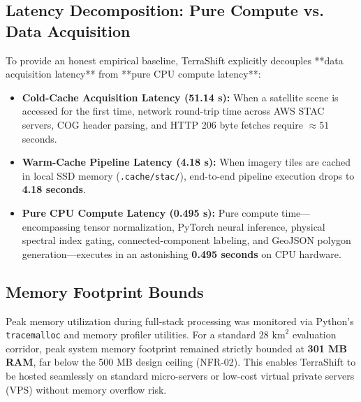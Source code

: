 \subsection{Latency Decomposition: Pure Compute vs. Data Acquisition}
To provide an honest empirical baseline, TerraShift explicitly decouples **data acquisition latency** from **pure CPU compute latency**:
\begin{itemize}
    \item \textbf{Cold-Cache Acquisition Latency (51.14 s):} When a satellite scene is accessed for the first time, network round-trip time across AWS STAC servers, COG header parsing, and HTTP 206 byte fetches require $\approx 51$ seconds.
    \item \textbf{Warm-Cache Pipeline Latency (4.18 s):} When imagery tiles are cached in local SSD memory (\texttt{.cache/stac/}), end-to-end pipeline execution drops to \textbf{4.18 seconds}.
    \item \textbf{Pure CPU Compute Latency (0.495 s):} Pure compute time—encompassing tensor normalization, PyTorch neural inference, physical spectral index gating, connected-component labeling, and GeoJSON polygon generation—executes in an astonishing \textbf{0.495 seconds} on CPU hardware.
\end{itemize}

\subsection{Memory Footprint Bounds}
Peak memory utilization during full-stack processing was monitored via Python's \texttt{tracemalloc} and memory profiler utilities. For a standard $28\text{ km}^2$ evaluation corridor, peak system memory footprint remained strictly bounded at \textbf{301 MB RAM}, far below the 500 MB design ceiling (NFR-02). This enables TerraShift to be hosted seamlessly on standard micro-servers or low-cost virtual private servers (VPS) without memory overflow risk.

